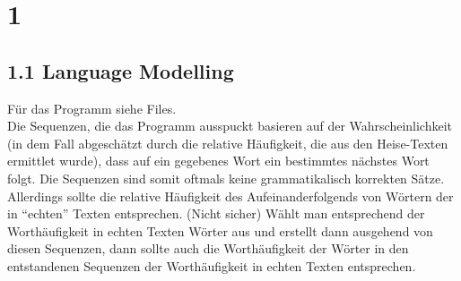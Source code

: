 \documentclass[a4paper,11pt,fleqn]{scrartcl}
\title{\titleinfo}
\author{\authorinfo}
\begin{document}
\maketitle
\notag

\section*{1}
\subsection*{1.1 Language Modelling}
Für das Programm siehe Files.\\
Die Sequenzen, die das Programm ausspuckt basieren auf der Wahrscheinlichkeit (in dem Fall abgeschätzt durch die relative Häufigkeit, die aus den Heise-Texten ermittlet wurde), dass auf ein gegebenes Wort ein bestimmtes nächstes Wort folgt. Die Sequenzen sind somit oftmals keine grammatikalisch korrekten Sätze. 
Allerdings sollte die relative Häufigkeit des Aufeinanderfolgends von Wörtern der in ``echten'' Texten entsprechen. (Nicht sicher) Wählt man entsprechend der Worthäufigkeit in echten Texten Wörter aus und erstellt dann ausgehend von diesen Sequenzen, dann sollte auch die Worthäufigkeit der Wörter in den entstandenen Sequenzen der Worthäufigkeit in echten Texten entsprechen. 
\end{document}
